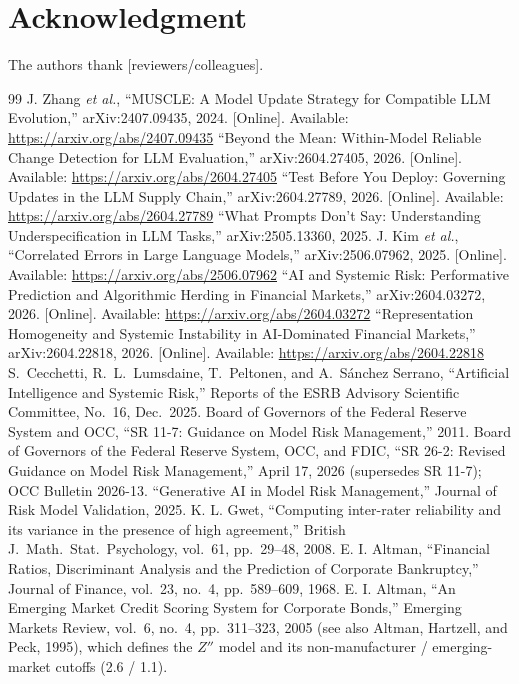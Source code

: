\documentclass[10pt,twocolumn]{article}
\begin{document}
\section*{Acknowledgment}
The authors thank [reviewers/colleagues].

\begin{thebibliography}{99}
\small
{} J. Zhang \emph{et al.}, ``MUSCLE: A Model Update Strategy for Compatible LLM Evolution,'' arXiv:2407.09435, 2024. [Online]. Available: \url{https://arxiv.org/abs/2407.09435}
 ``Beyond the Mean: Within-Model Reliable Change Detection for LLM Evaluation,'' arXiv:2604.27405, 2026. [Online]. Available: \url{https://arxiv.org/abs/2604.27405}
 ``Test Before You Deploy: Governing Updates in the LLM Supply Chain,'' arXiv:2604.27789, 2026. [Online]. Available: \url{https://arxiv.org/abs/2604.27789}
 ``What Prompts Don't Say: Understanding Underspecification in LLM Tasks,'' arXiv:2505.13360, 2025.
 J. Kim \emph{et al.}, ``Correlated Errors in Large Language Models,'' arXiv:2506.07962, 2025. [Online]. Available: \url{https://arxiv.org/abs/2506.07962}
 ``AI and Systemic Risk: Performative Prediction and Algorithmic Herding in Financial Markets,'' arXiv:2604.03272, 2026. [Online]. Available: \url{https://arxiv.org/abs/2604.03272}
 ``Representation Homogeneity and Systemic Instability in AI-Dominated Financial Markets,'' arXiv:2604.22818, 2026. [Online]. Available: \url{https://arxiv.org/abs/2604.22818}
 S.\ Cecchetti, R.\ L.\ Lumsdaine, T.\ Peltonen, and A.\ S\'anchez Serrano, ``Artificial Intelligence and Systemic Risk,'' Reports of the ESRB Advisory Scientific Committee, No.~16, Dec.\ 2025.
 Board of Governors of the Federal Reserve System and OCC, ``SR 11-7: Guidance on Model Risk Management,'' 2011.
 Board of Governors of the Federal Reserve System, OCC, and FDIC, ``SR 26-2: Revised Guidance on Model Risk Management,'' April 17, 2026 (supersedes SR 11-7); OCC Bulletin 2026-13.
 ``Generative AI in Model Risk Management,'' Journal of Risk Model Validation, 2025.
 K. L. Gwet, ``Computing inter-rater reliability and its variance in the presence of high agreement,'' British J.\ Math.\ Stat.\ Psychology, vol.~61, pp.~29--48, 2008.
 E. I. Altman, ``Financial Ratios, Discriminant Analysis and the Prediction of Corporate Bankruptcy,'' Journal of Finance, vol.~23, no.~4, pp.~589--609, 1968.
 E. I. Altman, ``An Emerging Market Credit Scoring System for Corporate Bonds,'' Emerging Markets Review, vol.~6, no.~4, pp.~311--323, 2005 (see also Altman, Hartzell, and Peck, 1995), which defines the $Z''$ model and its non-manufacturer / emerging-market cutoffs (2.6 / 1.1).
\end{thebibliography}
\end{document}
